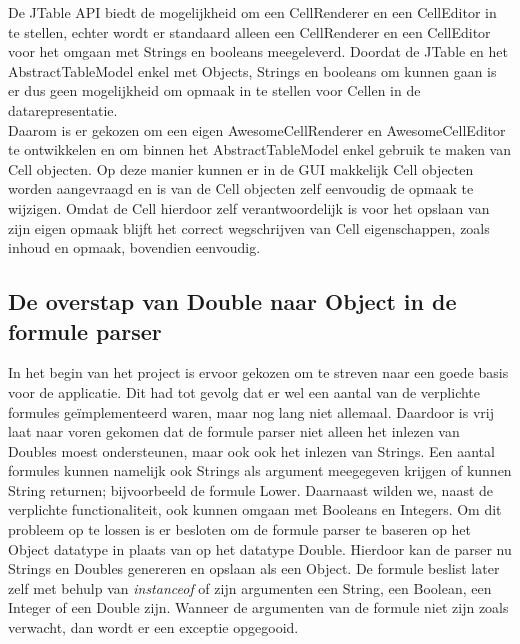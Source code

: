 \documentclass[a4paper,11pt,titlepage]{scrartcl}
\begin{document}
De JTable API biedt de mogelijkheid om een CellRenderer en een CellEditor in te stellen, echter wordt er standaard alleen een CellRenderer en een CellEditor voor het omgaan met Strings en booleans meegeleverd. Doordat de JTable en het AbstractTableModel enkel met Objects, Strings en booleans om kunnen gaan is er dus geen mogelijkheid om opmaak in te stellen voor Cellen in de datarepresentatie.\\

Daarom is er gekozen om een eigen AwesomeCellRenderer en AwesomeCellEditor te ontwikkelen en om binnen het AbstractTableModel enkel gebruik te maken van Cell objecten. Op deze manier kunnen er in de GUI makkelijk Cell objecten worden aangevraagd en is van de Cell objecten zelf eenvoudig de opmaak te wijzigen. Omdat de Cell hierdoor zelf verantwoordelijk is voor het opslaan van zijn eigen opmaak blijft het correct wegschrijven van Cell eigenschappen, zoals inhoud en opmaak, bovendien eenvoudig.

\subsection{De overstap van Double naar Object in de formule parser}
In het begin van het project is ervoor gekozen om te streven naar een goede basis voor de applicatie. Dit had tot gevolg dat er wel een aantal van de verplichte formules geïmplementeerd waren, maar nog lang niet allemaal. Daardoor is vrij laat naar voren gekomen dat de formule parser niet alleen het inlezen van Doubles moest ondersteunen, maar ook ook het inlezen van Strings. Een aantal formules kunnen namelijk ook Strings als argument meegegeven krijgen of kunnen String returnen; bijvoorbeeld de formule Lower. Daarnaast wilden we, naast de verplichte functionaliteit, ook kunnen omgaan met Booleans en Integers. Om dit probleem op te lossen is er besloten om de formule parser te baseren op het Object datatype in plaats van op het datatype Double. Hierdoor kan de parser nu Strings en Doubles genereren en opslaan als een Object. De formule beslist later zelf met behulp van \textit{instanceof} of zijn argumenten een String, een Boolean, een Integer of een Double zijn. Wanneer de argumenten van de formule niet zijn zoals verwacht, dan wordt er een exceptie opgegooid.
\end{document}
